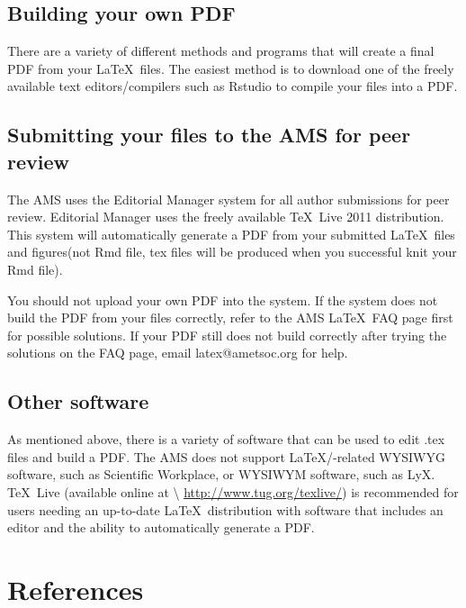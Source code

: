 \documentclass[draft]{ametsoc}
\begin{document}
\subsection{Building your own PDF}\label{building-your-own-pdf}

There are a variety of different methods and programs that will create a
final PDF from your \LaTeX~files. The easiest method is to download one
of the freely available text editors/compilers such as Rstudio to
compile your files into a PDF.

\subsection{Submitting your files to the AMS for peer
review}\label{submitting-your-files-to-the-ams-for-peer-review}

The AMS uses the Editorial Manager system for all author submissions for
peer review. Editorial Manager uses the freely available \TeX~Live 2011
distribution. This system will automatically generate a PDF from your
submitted \LaTeX~files and figures(not Rmd file, tex files will be
produced when you successful knit your Rmd file).

You should not upload your own PDF into the system. If the system does
not build the PDF from your files correctly, refer to the AMS \LaTeX~FAQ
page first for possible solutions. If your PDF still does not build
correctly after trying the solutions on the FAQ page, email
latex@ametsoc.org for help.

\subsection{Other software}\label{other-software}

As mentioned above, there is a variety of software that can be used to
edit .tex files and build a PDF. The AMS does not support
\LaTeX/-related WYSIWYG software, such as Scientific Workplace, or
WYSIWYM software, such as LyX. \TeX~Live (available online at
\textbackslash{} \url{http://www.tug.org/texlive/}) is recommended for
users needing an up-to-date \LaTeX~distribution with software that
includes an editor and the ability to automatically generate a PDF.

\section*{References}\label{references}
\end{document}
